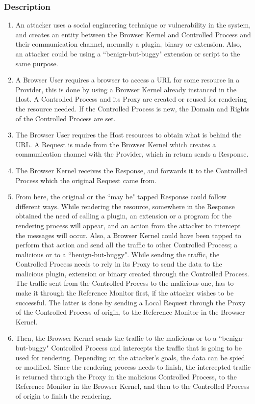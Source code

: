 \documentclass{sig-alternate-05-2015}
\begin{document}
  \subsubsection*{Description}
      \begin{enumerate}
        \item An attacker uses a social engineering technique or vulnerability in the system, and creates an entity between the Browser Kernel and Controlled Process and their communication channel, normally a plugin, binary or extension. Also, an attacker could be using a ``benign-but-buggy" extension or script to the same purpose.
        \item A Browser User requires a browser to access a URL for some resource in a Provider, this is done by using a Browser Kernel already instanced in the Host. A Controlled Process and its Proxy are created or reused for rendering the resource needed. If the Controlled Process is new, the Domain and Rights of the Controlled Process are set.
        \item The Browser User requires the Host resources to obtain what is behind the URL. A Request is made from the Browser Kernel which creates a communication channel with the Provider, which in return sends a Response.
        \item The Browser Kernel receives the Response, and forwards it to the Controlled Process which the original Request came from.
        \item From here, the original or the ``may be" tapped Response could follow different ways. While rendering the resource, somewhere in the Response obtained the need of calling a plugin, an extension or a program for the rendering process will appear, and an action from the attacker to intercept the messages will occur. Also, a Browser Kernel could have been tapped to perform that action and send all the traffic to other Controlled Process; a malicious or to a ``benign-but-buggy". While sending the traffic, the Controlled Process needs to rely in its Proxy to send the data to the malicious plugin, extension or binary created through the Controlled Process. The traffic sent from the Controlled Process to the malicious one, has to make it through the Reference Monitor first, if the attacker wishes to be successful. The latter is done by sending a Local Request through the Proxy of the Controlled Process of origin, to the Reference Monitor in the Browser Kernel.
        \item Then, the Browser Kernel sends the traffic to the malicious or to a ``benign-but-buggy" Controlled Process and intercepts the traffic that is going to be used for rendering. Depending on the attacker's goals, the data can be spied or modified. Since the rendering process needs to finish, the intercepted traffic is returned through the Proxy in the malicious Controlled Process, to the Reference Monitor in the Browser Kernel, and then to the Controlled Process of origin to finish the rendering.

\end{enumerate}
\end{document}
